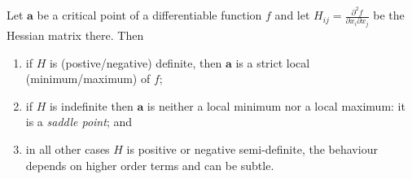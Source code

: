 
\begin{proposition}[]
    Let $\bm a$ be a critical point of a differentiable function $f$
    and let
    $H_{ij} = \frac{\partial^2 f}{\partial x_i \partial x_j}$
    be the Hessian matrix there.
    Then
    \begin{enumerate}
        \item if $H$ is (postive/negative) definite, 
            then $\bm a$ is a strict local (minimum/maximum) of $f$;

        \item if $H$ is indefinite then $\bm a$ is neither
            a local minimum nor a local maximum:
            it is a \emph{saddle point}; and
            
        \item in all other cases $H$ is positive or negative semi-definite,
            the behaviour depends on higher order terms and can be subtle.
    \end{enumerate}
\end{proposition}

